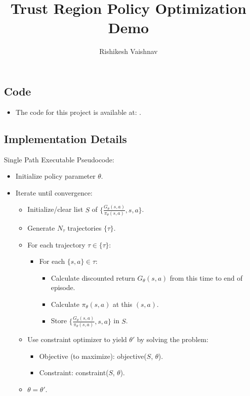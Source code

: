 \documentclass[a4paper]{article}
\title{Trust Region Policy Optimization Demo}
\author{Rishikesh Vaishnav}
\begin{document}
\maketitle
\subsection*{Code}
\begin{itemize}
    \item The code for this project is available at: 
    \url{}.
\end{itemize}
\subsection*{Implementation Details}
Single Path Executable Pseudocode:
\begin{itemize}
    \item Initialize policy parameter $\theta$.
    \item Iterate until convergence:
    \begin{itemize}
        \item Initialize/clear list $S$ of $\{\frac{G_{\theta}(s, a)}
            {\pi_{\theta}(s, a)}, s, a\}$.
        \item Generate $N_{\tau}$ trajectories $\{\tau\}$.
        \item For each trajectory $\tau \in \{\tau\}$:
        \begin{itemize}
            \item For each $\{s, a\} \in \tau$:
            \begin{itemize}
                \item Calculate discounted return $G_{\theta}(s, a)$ from this
                    time to end of episode.
                \item Calculate $\pi_{\theta}(s, a)$ at this $(s, a)$.
                \item Store $\{\frac{G_{\theta}(s, a)} 
                    {\pi_{\theta}(s, a)}, s, a\}$ in $S$.
            \end{itemize}
        \end{itemize}
        \item Use constraint optimizer to yield
            $\theta'$ by solving the problem:
        \begin{itemize}
            \item Objective (to maximize): objective($S$, $\theta$).
            \item Constraint: constraint($S$, $\theta$).
        \end{itemize}
        \item $\theta = \theta'$.
    \end{itemize}
\end{itemize}
\end{document}
